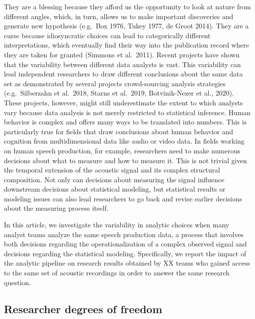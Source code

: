 \documentclass[
  english,
  man,floatsintext]{apa6}
\begin{document}
They are a blessing because they afford us the opportunity to look at nature from different angles, which, in turn, allows us to make important discoveries and generate new hypothesis (e.g.~Box 1976, Tukey 1977, de Groot 2014).
They are a curse because idiosyncratic choices can lead to categorically different interpretations, which eventually find their way into the publication record where they are taken for granted (Simmons et al.~2011).
Recent projects have shown that the variability between different data analysts is vast.
This variability can lead independent researchers to draw different conclusions about the same data set as demonstrated by several projects crowd-sourcing analysis strategies (e.g.~Silberzahn et al.~2018, Starns et al.~2019, Botvinik-Nezer et al., 2020).
These projects, however, might still underestimate the extent to which analysts vary because data analysis is not merely restricted to statistical inference.
Human behavior is complex and offers many ways to be translated into numbers.
This is particularly true for fields that draw conclusions about human behavior and cognition from multidimensional data like audio or video data.
In fields working on human speech production, for example, researchers need to make numerous decisions about what to measure and how to measure it.
This is not trivial given the temporal extension of the acoustic signal and its complex structural composition.
Not only can decisions about measuring the signal influence downstream decisions about statistical modeling, but statistical results or modeling issues can also lead researchers to go back and revise earlier decisions about the measuring process itself.

In this article, we investigate the variability in analytic choices when many analyst teams analyze the same speech production data, a process that involves both decisions regarding the operationalization of a complex observed signal and decisions regarding the statistical modeling.
Specifically, we report the impact of the analytic pipeline on research results obtained by XX teams who gained access to the same set of acoustic recordings in order to answer the same research question.

\hypertarget{researcher-degrees-of-freedom}{%
\subsection{Researcher degrees of freedom}\label{researcher-degrees-of-freedom}}
\end{document}
